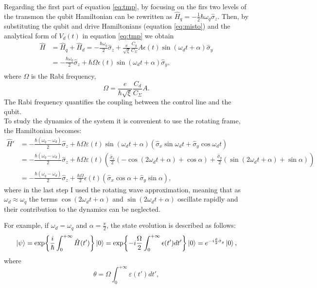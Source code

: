 Regarding the first part of equation \ref{eq:tmp}, by focusing on the firs two levels of the transmon the qubit Hamiltonian can be rewritten as $\hat{H}_q = -\frac{1}{2}\hbar\omega_q\hat{\sigma}_z$.
Then, by substituting the qubit and drive Hamiltonians (equation \ref{eq:misto}) and the analytical form of $V_d(t)$ in equation \ref{eq:tmp} we obtain
\begin{align}
    \hat{H} &= \hat{H}_q + \hat{H}_d = -\frac{\hbar \omega_q}{2} \hat{\sigma}_z + \frac{e}{\sqrt{\xi}} \frac{C_g}{C_{\Sigma}} A \epsilon(t) \sin(\omega_d t + \alpha) \hat{\sigma}_y\\
    &= -\frac{\hbar \omega_q}{2} \hat{\sigma}_z + \hbar \Omega \epsilon(t) \sin(\omega_d t + \alpha) \hat{\sigma}_y, \\ \label{eq:interaction_hamiltonian}
\end{align} 
where $\Omega$ is the Rabi frequency, 
\begin{equation}\label{eq:Rabi_frequency}
    \Omega = \frac{e}{\hbar\sqrt{\xi}}\frac{C_d}{C_\Sigma}A.
\end{equation}
The Rabi frequency quantifies the coupling between the control line and the qubit.\\
To study the dynamics of the system it is convenient to use the rotating frame, the Hamiltonian becomes: %
\begin{align}
    \hat{H}' &= -\frac{\hbar (\omega_q - \omega_d)}{2} \hat{\sigma}_z + \hbar \Omega \varepsilon(t) \sin(\omega_d t + \alpha)\left( \hat{\sigma}_x \sin \omega_d t + \hat{\sigma}_y \cos \omega_d t \right)\\
    &= -\frac{\hbar (\omega_q - \omega_d)}{2} \hat{\sigma}_z + \hbar \Omega \varepsilon(t)\left(\frac{\hat{\sigma}_x}{2} \left( -\cos(2\omega_d t + \alpha) + \cos \alpha \right) + \frac{\hat{\sigma}_y}{2} \left( \sin(2\omega_d t + \alpha) + \sin \alpha \right)\right)\\
    &=  -\frac{\hbar (\omega_q - \omega_d)}{2} \hat{\sigma}_z + \frac{\hbar \Omega}{2} \epsilon(t) \left( \hat{\sigma}_x \cos \alpha + \hat{\sigma}_y \sin \alpha \right),
\end{align}
where in the last step I used the rotating wave approximation, meaning that as $\omega_d\approx\omega_q$ the terms $\cos(2\omega_d t + \alpha)$ and $\sin(2\omega_d t + \alpha)$ oscillate rapidly and their contribution to the dynamics can be neglected.

For example, if $\omega_d = \omega_q$ and $\alpha=\frac{\pi}{2}$, the state evolution is described as follows:
\begin{align}
    \ket{\psi} = \exp{\frac{i}{\hbar}\int_{0}^{+\infty} \hat{H}(t')}\ket{0} = \exp{-i\frac{\Omega}{2}\int_{0}^{+\infty}\epsilon(t')dt'}\ket{0} = e^{-i\frac{\theta}{2}\hat{\sigma}_y}\ket{0},
\end{align}
where
\begin{equation}
    \theta = \Omega\int_{0}^{+\infty}\varepsilon(t')dt',
\end{equation}

